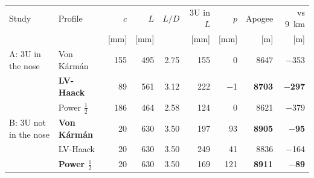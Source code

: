 \begin{tabular}{@{}llrrrrrrr@{}}
\toprule
Study & Profile & $c$ & $L$ & $L/D$ & 3U in $L$ & $p$ & Apogee & vs \SI{9}{km} \\
 & & [mm] & [mm] & & [mm] & [mm] & [m] & [m] \\
\midrule
A: 3U in the nose & Von K\'arm\'an & 155 & 495 & 2.75 & 155 & 0 & 8647 & $-$353 \\
 & \textbf{LV-Haack} & 89 & 561 & 3.12 & 222 & $-$1 & \textbf{8703} & \textbf{$-$297} \\
 & Power $\tfrac12$ & 186 & 464 & 2.58 & 124 & 0 & 8621 & $-$379 \\
\midrule
B: 3U not in the nose & \textbf{Von K\'arm\'an} & 20 & 630 & 3.50 & 197 & 93 & \textbf{8905} & \textbf{$-$95} \\
 & LV-Haack & 20 & 630 & 3.50 & 249 & 41 & 8836 & $-$164 \\
 & \textbf{Power $\tfrac12$} & 20 & 630 & 3.50 & 169 & 121 & \textbf{8911} & \textbf{$-$89} \\
\bottomrule
\end{tabular}
